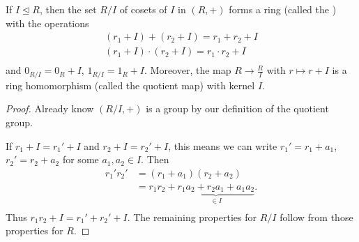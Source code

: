 \documentclass[egregdoesnotlikesansseriftitles,a4paper]{scrartcl}
\begin{document}
\begin{theorem}
       If $I \unlhd R$, then the set $R/I$ of cosets of $I$ in $(R,+)$ forms a ring (called the ) with the operations
       \begin{align*}
             (r_1 +I )+ (r_2 + I)= r_1 +r_2 +I\\
             (r_1 +I) \cdot (r_2 +I )= r_1 \cdot r_2 +I\\
       \end{align*}
       and $0_{R/I}=0_{R}+I$, $1_{R/I}=1_{R}+I$. Moreover, the map $R \rightarrow \frac{R}{I}$ with $r \mapsto r+I$ is a ring homomorphism (called the quotient map) with kernel $I$.
       \begin{proof}
            Already know $(R/I, +)$ is a group by our definition of the quotient group. 
            
            If $r_1 +I= r_1' + I$ and $r_2 +I= r_2 '+I$, this means we can write $r_1 ' =r_1 +a_1 $, $r_2 ' = r_2 +a_2 $ for some $a_1 , a_2 \in I$. Then 
            \begin{align*}
                  r_1 ' r_2 ' &= (r_1 +a_1 )(r_2 +a_2 )\\
                  &=r_1 r_2 +\underbrace{r_1 a_2 +r_2 a_1 +a_1 a_2}_{\in I}. \\ 
            \end{align*}
            Thus $r_1 r_2 +I=r_1 ' + r_2 ' +I$. The remaining properties for $R/I$ follow from those properties for $R$.
     \end{proof}
\end{theorem}
\end{document}
